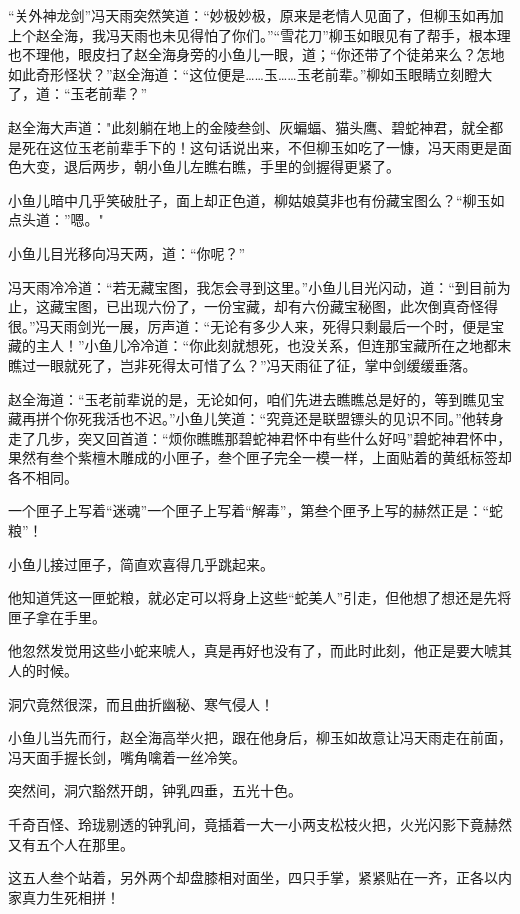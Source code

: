 \documentclass[12pt,oneside]{book}
\begin{document}
``关外神龙剑''冯天雨突然笑道：``妙极妙极，原来是老情人见面了，但柳玉如再加上个赵全海，我冯天雨也未见得怕了你们。''``雪花刀''柳玉如眼见有了帮手，根本理也不理他，眼皮扫了赵全海身旁的小鱼儿一眼，道；``你还带了个徒弟来么？怎地如此奇形怪状？''赵全海道：``这位便是\ldots\ldots 玉\ldots\ldots 玉老前辈。''柳如玉眼睛立刻瞪大了，道：``玉老前辈？''

赵全海大声道："此刻躺在地上的金陵叁剑、灰蝙蝠、猫头鹰、碧蛇神君，就全都是死在这位玉老前辈手下的！这句话说出来，不但柳玉如吃了一慷，冯天雨更是面色大变，退后两步，朝小鱼儿左瞧右瞧，手里的剑握得更紧了。

小鱼儿暗中几乎笑破肚子，面上却正色道，柳姑娘莫非也有份藏宝图么？``柳玉如点头道：''嗯。"

小鱼儿目光移向冯天两，道：``你呢？''

冯天雨冷冷道：``若无藏宝图，我怎会寻到这里。''小鱼儿目光闪动，道：``到目前为止，这藏宝图，已出现六份了，一份宝藏，却有六份藏宝秘图，此次倒真奇怪得很。''冯天雨剑光一展，厉声道：``无论有多少人来，死得只剩最后一个时，便是宝藏的主人！''小鱼儿冷冷道：``你此刻就想死，也没关系，但连那宝藏所在之地都末瞧过一眼就死了，岂非死得太可惜了么？''冯天雨征了征，掌中剑缓缓垂落。

赵全海道：``玉老前辈说的是，无论如何，咱们先进去瞧瞧总是好的，等到瞧见宝藏再拼个你死我活也不迟。''小鱼儿笑道：``究竟还是联盟镖头的见识不同。''他转身走了几步，突又回首道：``烦你瞧瞧那碧蛇神君怀中有些什么好吗''碧蛇神君怀中，果然有叁个紫檀木雕成的小匣子，叁个匣子完全一模一样，上面贴着的黄纸标签却各不相同。

一个匣子上写着``迷魂''一个匣子上写着``解毒''，第叁个匣予上写的赫然正是：``蛇粮''！

小鱼儿接过匣子，简直欢喜得几乎跳起来。

他知道凭这一匣蛇粮，就必定可以将身上这些``蛇美人''引走，但他想了想还是先将匣子拿在手里。

他忽然发觉用这些小蛇来唬人，真是再好也没有了，而此时此刻，他正是要大唬其人的时候。

洞穴竟然很深，而且曲折幽秘、寒气侵人！

小鱼儿当先而行，赵全海高举火把，跟在他身后，柳玉如故意让冯天雨走在前面，冯天面手握长剑，嘴角噙着一丝冷笑。

突然间，洞穴豁然开朗，钟乳四垂，五光十色。

千奇百怪、玲珑剔透的钟乳间，竟插着一大一小两支松枝火把，火光闪影下竟赫然又有五个人在那里。

这五人叁个站着，另外两个却盘膝相对面坐，四只手掌，紧紧贴在一齐，正各以内家真力生死相拼！
\end{document}
